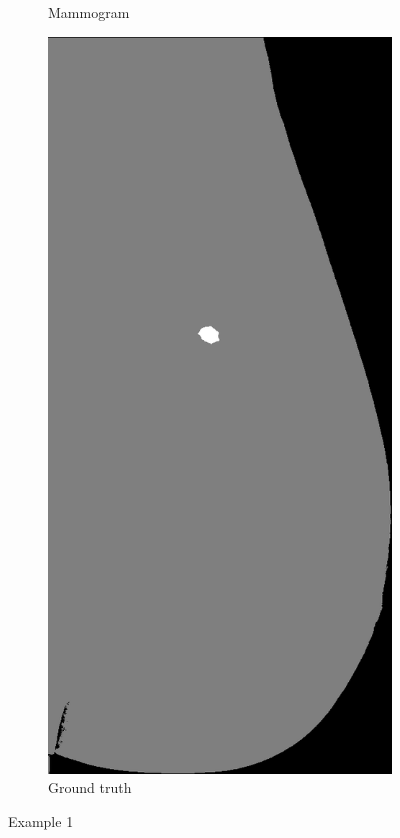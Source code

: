 \begin{figure}[h]
\begin{subfigure}{0.2\textwidth}
         \caption{Mammogram}
	\end{subfigure}
	\quad
	\begin{subfigure}{0.2\textwidth}
		\centering
			\includegraphics[width=\textwidth]{plots/examples/label_1.png}
         \caption{Ground truth}
	\end{subfigure}
	\caption[Example 1]{Example 1}
\end{figure}

